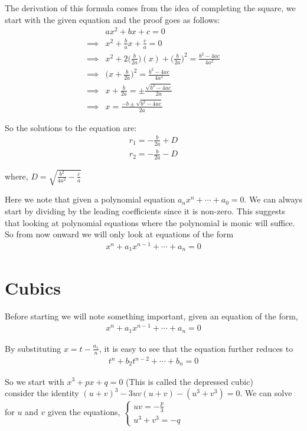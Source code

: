 \documentclass[a4paper,12pt,abstracton]{scrartcl}
\theoremstyle{dotlessP}
\theoremstyle{dotlessS}
\theoremstyle{remark}
\theoremstyle{definition}
\begin{document}
The derivation of this formula comes from the idea of completing the square, we start with the given equation and the proof goes as follows:
\begin{align*}
&ax^2+bx+c=0\\
\implies& x^2+\frac{b}{a}x+\frac{c}{a}=0\\
\implies& x^2+2\bigg(\frac{b}{2a}\bigg)(x)+\bigg(\frac{b}{2a}\bigg)^2=\frac{b^2-4ac}{4a^2}\\
\implies& \bigg(x+\frac{b}{2a}\bigg)^2=\frac{b^2-4ac}{4a^2}\\
\implies& x+\frac{b}{2a}=\pm\frac{\sqrt{b^2-4ac}}{2a}\\
\implies& x=\frac{-b\pm\sqrt{b^2-4ac}}{2a}
\end{align*} 

So the solutions to the equation are:
\begin{align*}
r_1=-\frac{b}{2a}+D\\
r_2=-\frac{b}{2a}-D
\end{align*}

where, $D=\sqrt{\frac{b^2}{4a^2}-\frac{c}{a}}$

Here we note that given a polynomial equation $a_nx^n+\cdots+a_0=0$. We can always start by dividing by the leading coefficients since it is non-zero. This suggests that looking at polynomial equations where the polynomial is monic will suffice. So from now onward we will only look at equations of the form 
\begin{align*}
x^n+a_1x^{n-1}+\cdots+a_n=0
\end{align*}

\eject

\section{Cubics}

Before starting we will note something important, given an equation of the form,
\begin{align*}
x^n+a_1x^{n-1}+\cdots+a_n=0
\end{align*}

By substituting $x=t-\frac{a_1}{n}$, it is easy to see that the equation further reduces to 
\begin{align*}
t^n+b_2t^{n-2}+\cdots+b_n=0
\end{align*}

So we start with $x^3+px+q=0$ (This is called the depressed cubic)\\
consider the identity $(u+v)^3-3uv(u+v)-(u^3+v^3)=0$. We can solve for $u$ and $v$ given the equations,
$\begin{cases}
uv=-\frac{p}{3}\\
u^3+v^3=-q
\end{cases}$
\end{document}
